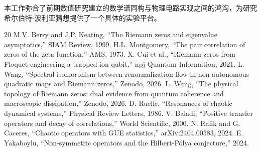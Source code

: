 \documentclass[twocolumn]{article}
\begin{document}
本工作弥合了前期数值研究建立的数学谱同构与物理电路实现之间的鸿沟，为研究希尔伯特-波利亚猜想提供了一个具体的实验平台。

\begin{thebibliography}{20}
 M.V. Berry and J.P. Keating, ``The Riemann zeros and eigenvalue asymptotics,'' SIAM Review, 1999.
 H.L. Montgomery, ``The pair correlation of zeros of the zeta function,'' AMS, 1973.
 X. Cui et al., ``Riemann zeros from Floquet engineering a trapped-ion qubit,'' npj Quantum Information, 2021.
 L. Wang, ``Spectral isomorphism between renormalization flow in non-autonomous quadratic maps and Riemann zeros,'' Zenodo, 2026.
 L. Wang, ``The physical topology of Riemann zeros: dual evidence from quantum coherence and macroscopic dissipation,'' Zenodo, 2026.
 D. Ruelle, ``Resonances of chaotic dynamical systems,'' Physical Review Letters, 1986.
 V. Baladi, ``Positive transfer operators and decay of correlations,'' World Scientific, 2000.
 N. Rafik and G. Caceres, ``Chaotic operators with GUE statistics,'' arXiv:2404.00583, 2024.
 E. Yakaboylu, ``Non-symmetric operators and the Hilbert-P\'olya conjecture,'' 2024.
\end{thebibliography}
\end{document}
